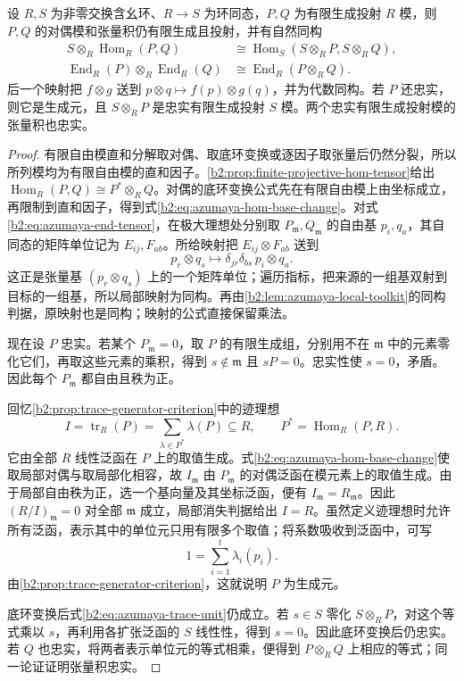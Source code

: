 \begin{lemma}[有限投射模与底环变换]\label{b2:lem:azumaya-projective-base-change}
	设 \(R,S\) 为非零交换含幺环、\(R\to S\) 为环同态，\(P,Q\) 为有限生成投射 \(R\) 模，则 \(P,Q\) 的对偶模和张量积仍有限生成且投射，并有自然同构
	\begin{align}
		S\otimes_R\operatorname{Hom}_R(P,Q) &\cong\operatorname{Hom}_S(S\otimes_RP,S\otimes_RQ),\label{b2:eq:azumaya-hom-base-change}\\
		\operatorname{End}_R(P)\otimes_R\operatorname{End}_R(Q) &\cong\operatorname{End}_R(P\otimes_RQ).\label{b2:eq:azumaya-end-tensor}
	\end{align}
	后一个映射把 \(f\otimes g\) 送到 \(p\otimes q\mapsto f(p)\otimes g(q)\)，并为代数同构。若 \(P\) 还忠实，则它是生成元，且 \(S\otimes_RP\) 是忠实有限生成投射 \(S\) 模。两个忠实有限生成投射模的张量积也忠实。
\end{lemma}
\begin{proof}
	有限自由模直和分解取对偶、取底环变换或逐因子取张量后仍然分裂，所以所列模均为有限自由模的直和因子。\cref{b2:prop:finite-projective-hom-tensor}给出 \(\operatorname{Hom}_R(P,Q)\cong P^*\otimes_RQ\)。对偶的底环变换公式先在有限自由模上由坐标成立，再限制到直和因子，得到式\eqref{b2:eq:azumaya-hom-base-change}。对式\eqref{b2:eq:azumaya-end-tensor}，在极大理想处分别取 \(P_{\mathfrak m},Q_{\mathfrak m}\) 的自由基 \(p_i,q_a\)，其自同态的矩阵单位记为 \(E_{ij},F_{ab}\)。所给映射把 \(E_{ij}\otimes F_{ab}\) 送到
	\[
		p_r\otimes q_s\longmapsto\delta_{jr}\delta_{bs}\,p_i\otimes q_a.
	\]
	这正是张量基 \((p_r\otimes q_s)\) 上的一个矩阵单位；遍历指标，把来源的一组基双射到目标的一组基，所以局部映射为同构。再由\cref{b2:lem:azumaya-local-toolkit}的同构判据，原映射也是同构；映射的公式直接保留乘法。

	现在设 \(P\) 忠实。若某个 \(P_{\mathfrak m}=0\)，取 \(P\) 的有限生成组，分别用不在 \(\mathfrak m\) 中的元素零化它们，再取这些元素的乘积，得到 \(s\notin\mathfrak m\) 且 \(sP=0\)。忠实性使 \(s=0\)，矛盾。因此每个 \(P_{\mathfrak m}\) 都自由且秩为正。

	回忆\cref{b2:prop:trace-generator-criterion}中的迹理想
	\[
		I=\operatorname{tr}_R(P)=\sum_{\lambda\in P^*}\lambda(P)\subseteq R, \qquad P^*=\operatorname{Hom}_R(P,R).
	\]
	它由全部 \(R\) 线性泛函在 \(P\) 上的取值生成。式\eqref{b2:eq:azumaya-hom-base-change}使取局部对偶与取局部化相容，故 \(I_{\mathfrak m}\) 由 \(P_{\mathfrak m}\) 的对偶泛函在模元素上的取值生成。由于局部自由秩为正，选一个基向量及其坐标泛函，便有 \(I_{\mathfrak m}=R_{\mathfrak m}\)。因此 \((R/I)_{\mathfrak m}=0\) 对全部 \(\mathfrak m\) 成立，局部消失判据给出 \(I=R\)。虽然定义迹理想时允许所有泛函，表示其中的单位元只用有限多个取值；将系数吸收到泛函中，可写
	\begin{equation}\label{b2:eq:azumaya-trace-unit}
		1=\sum_{i=1}^t\lambda_i(p_i).
	\end{equation}
	由\cref{b2:prop:trace-generator-criterion}，这就说明 \(P\) 为生成元。

	底环变换后式\eqref{b2:eq:azumaya-trace-unit}仍成立。若 \(s\in S\) 零化 \(S\otimes_RP\)，对这个等式乘以 \(s\)，再利用各扩张泛函的 \(S\) 线性性，得到 \(s=0\)。因此底环变换后仍忠实。若 \(Q\) 也忠实，将两者表示单位元的等式相乘，便得到 \(P\otimes_RQ\) 上相应的等式；同一论证证明张量积忠实。
\end{proof}
